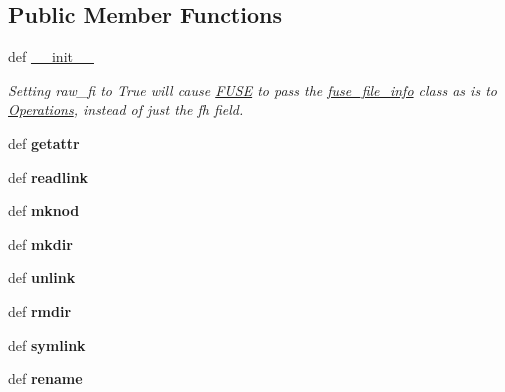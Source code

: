 \subsection*{Public Member Functions}
\begin{DoxyCompactItemize}
\item 
def \hyperlink{classfuse_1_1FUSE_a17d1d39eab4cdb800fa00d6bbc8f1897}{\-\_\-\-\_\-init\-\_\-\-\_\-}
\begin{DoxyCompactList}\small\item\em Setting raw\-\_\-fi to True will cause \hyperlink{classfuse_1_1FUSE}{F\-U\-S\-E} to pass the \hyperlink{classfuse_1_1fuse__file__info}{fuse\-\_\-file\-\_\-info} class as is to \hyperlink{classfuse_1_1Operations}{Operations}, instead of just the fh field. \end{DoxyCompactList}\item 
\hypertarget{classfuse_1_1FUSE_a803f9a3306690650af3f4063cfb6b5b9}{def {\bfseries getattr}}\label{classfuse_1_1FUSE_a803f9a3306690650af3f4063cfb6b5b9}

\item 
\hypertarget{classfuse_1_1FUSE_ad0894c09c51f67df36df928f7f38c58b}{def {\bfseries readlink}}\label{classfuse_1_1FUSE_ad0894c09c51f67df36df928f7f38c58b}

\item 
\hypertarget{classfuse_1_1FUSE_a400dc03e1bf15638590c2ac368f43ed6}{def {\bfseries mknod}}\label{classfuse_1_1FUSE_a400dc03e1bf15638590c2ac368f43ed6}

\item 
\hypertarget{classfuse_1_1FUSE_a25dcf7965d8e44108061fc2fe89f9520}{def {\bfseries mkdir}}\label{classfuse_1_1FUSE_a25dcf7965d8e44108061fc2fe89f9520}

\item 
\hypertarget{classfuse_1_1FUSE_aab199d555bf5e298215039d8920f9f58}{def {\bfseries unlink}}\label{classfuse_1_1FUSE_aab199d555bf5e298215039d8920f9f58}

\item 
\hypertarget{classfuse_1_1FUSE_aa9f196881744626e944b85d5bebac063}{def {\bfseries rmdir}}\label{classfuse_1_1FUSE_aa9f196881744626e944b85d5bebac063}

\item 
\hypertarget{classfuse_1_1FUSE_a622207011e254c7cbcbf60676bf3a9db}{def {\bfseries symlink}}\label{classfuse_1_1FUSE_a622207011e254c7cbcbf60676bf3a9db}

\item 
\hypertarget{classfuse_1_1FUSE_a95c4bf2b028e7723f6bd678aa705a027}{def {\bfseries rename}}\label{classfuse_1_1FUSE_a95c4bf2b028e7723f6bd678aa705a027}


\end{DoxyCompactItemize}
